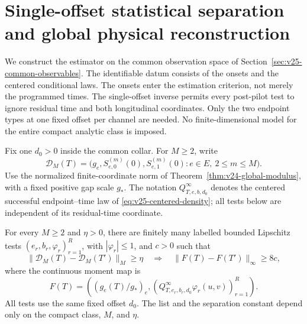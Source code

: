 \section{Single-offset statistical separation and global physical reconstruction}
\label{sec:v26-uniform-physical-global}
\label{sec:v25-uniform-physical-global}
\label{sec:v24-uniform-physical-global}

We construct the estimator on the common observation space of
Section~\ref{sec:v25-common-observables}.  The identifiable datum consists
of the onsets and the centered conditional laws.  The onsets enter the
estimation criterion, not merely the programmed times.  The single-offset
inverse permits every post-pilot test to ignore residual time and both
longitudinal coordinates.  Only the two endpoint types at one fixed offset
per channel are needed.  No finite-dimensional model for the entire compact
analytic class is imposed.

Fix one \(d_0>0\) inside the common collar.  For \(M\ge2\), write
\[
 \mathcal D_M(T)=\bigl(g_e,S_{e,0}^{(m)}(0),S_{e,1}^{(m)}(0):
                         e\in E,\ 2\le m\le M\bigr).
\]
Use the normalized finite-coordinate norm of
Theorem~\ref{thm:v24-global-modulus}, with a fixed positive gap scale
\(g_*\).  The notation \(Q^\infty_{T,e,b,d_0}\) denotes the centered successful
endpoint--time law of
\eqref{eq:v25-centered-density}; all tests below are independent of its
residual-time coordinate.

\begin{lemma}
\label{lem:v26-single-offset-separators}
\label{lem:v25-augmented-separators}
\label{lem:v24-finite-separators}
For every \(M\ge2\) and \(\eta>0\), there are finitely many labelled
bounded Lipschitz tests \((e_r,b_r,\varphi_r)_{r=1}^R\), with
\(|\varphi_r|\le1\), and \(c>0\) such that
\begin{equation}\label{eq:v25-mixed-separation}
 \|\mathcal D_M(T)-\mathcal D_M(T')\|_M\ge\eta
       \quad\Longrightarrow\quad\|F(T)-F(T')\|_\infty\ge8c,
\end{equation}
where the continuous moment map is
\begin{equation}\label{eq:v25-augmented-moment-map}
 F(T)=\left((g_e(T)/g_*)_e,
      \left(Q^\infty_{T,e_r,b_r,d_0}\varphi_r(u,v)\right)_{r=1}^R\right).
\end{equation}
All tests use the same fixed offset \(d_0\).  The list and the separation
constant depend only on the compact class, \(M\), and \(\eta\).
\end{lemma}

